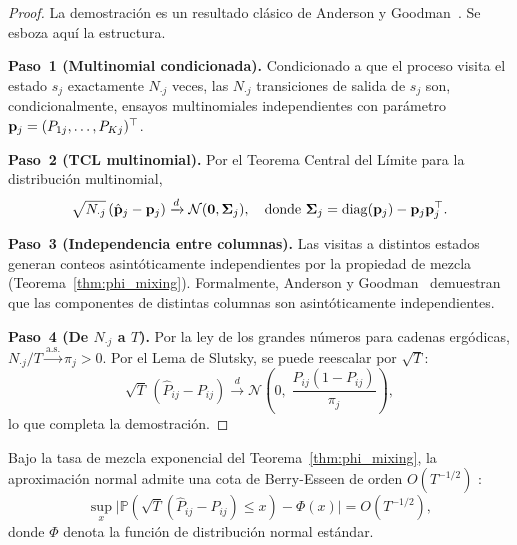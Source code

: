 \begin{proof}
La demostración es un resultado clásico de
Anderson y Goodman~\cite{AndersonGoodman1957}.  Se esboza aquí
la estructura.

\textbf{Paso~1 (Multinomial condicionada).}
Condicionado a que el proceso visita el estado $s_j$ exactamente
$N_{\cdot j}$ veces, las $N_{\cdot j}$ transiciones de salida de
$s_j$ son, condicionalmente, ensayos multinomiales independientes
con parámetro $\mathbf{p}_j = (P_{1j}, \ldots, P_{Kj})^\top$.

\textbf{Paso~2 (TCL multinomial).}
Por el Teorema Central del Límite para la distribución multinomial,
\[
\sqrt{N_{\cdot j}}\,(\hat{\mathbf{p}}_j - \mathbf{p}_j)
\xrightarrow{d}
\mathcal{N}(\mathbf{0}, \mathbf{\Sigma}_j),
\quad \text{donde } \mathbf{\Sigma}_j
= \mathrm{diag}(\mathbf{p}_j) - \mathbf{p}_j\mathbf{p}_j^\top.
\]

\textbf{Paso~3 (Independencia entre columnas).}
Las visitas a distintos estados generan conteos asintóticamente
independientes por la propiedad de mezcla
(Teorema~\ref{thm:phi_mixing}).  Formalmente, Anderson y
Goodman~\cite{AndersonGoodman1957} demuestran que las componentes
de distintas columnas son asintóticamente independientes.

\textbf{Paso~4 (De $N_{\cdot j}$ a $T$).}
Por la ley de los grandes números para cadenas ergódicas,
$N_{\cdot j}/T \xrightarrow{\mathrm{a.s.}} \pi_j > 0$.  Por
el Lema de Slutsky, se puede reescalar por $\sqrt{T}$:
\[
\sqrt{T}\,(\hat{P}_{ij} - P_{ij})
\xrightarrow{d} \mathcal{N}\!\left(0,\;
\frac{P_{ij}(1 - P_{ij})}{\pi_j}\right),
\]
lo que completa la demostración.
\end{proof}

\begin{remark}
\label{rem:berry_esseen}
Bajo la tasa de mezcla exponencial del
Teorema~\ref{thm:phi_mixing}, la aproximación normal admite una
cota de Berry-Esseen de orden $O(T^{-1/2})$
\cite{Bolthausen1982}:
\[
\sup_x \bigl|\mathbb{P}(\sqrt{T}(\hat{P}_{ij} - P_{ij}) \leq x)
- \Phi(x)\bigr| = O(T^{-1/2}),
\]
donde $\Phi$ denota la función de distribución normal estándar.
\end{remark}


